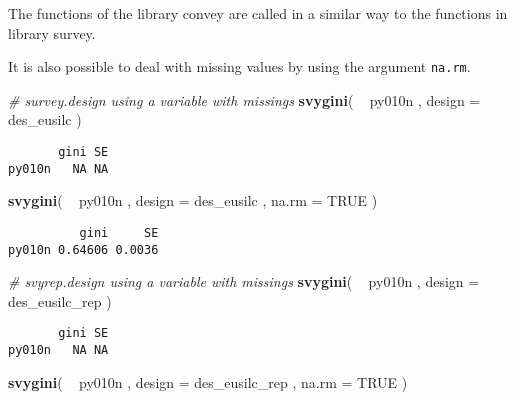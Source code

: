 \documentclass[]{book}
\newenvironment{Shaded}{\begin{snugshade}}{\end{snugshade}}
\newcommand{\KeywordTok}[1]{\textcolor[rgb]{0.13,0.29,0.53}{\textbf{{#1}}}}
\newcommand{\DataTypeTok}[1]{\textcolor[rgb]{0.13,0.29,0.53}{{#1}}}
\newcommand{\StringTok}[1]{\textcolor[rgb]{0.31,0.60,0.02}{{#1}}}
\newcommand{\CommentTok}[1]{\textcolor[rgb]{0.56,0.35,0.01}{\textit{{#1}}}}
\newcommand{\OtherTok}[1]{\textcolor[rgb]{0.56,0.35,0.01}{{#1}}}
\newcommand{\NormalTok}[1]{{#1}}
\begin{document}
The functions of the library convey are called in a similar way to the
functions in library survey.

It is also possible to deal with missing values by using the argument
\texttt{na.rm}.

\begin{Shaded}
\begin{Highlighting}[]
\CommentTok{# survey.design using a variable with missings}
\KeywordTok{svygini}\NormalTok{( ~}\StringTok{ }\NormalTok{py010n , }\DataTypeTok{design =} \NormalTok{des_eusilc )}
\end{Highlighting}
\end{Shaded}

\begin{verbatim}
       gini SE
py010n   NA NA
\end{verbatim}

\begin{Shaded}
\begin{Highlighting}[]
\KeywordTok{svygini}\NormalTok{( ~}\StringTok{ }\NormalTok{py010n , }\DataTypeTok{design =} \NormalTok{des_eusilc , }\DataTypeTok{na.rm =} \OtherTok{TRUE} \NormalTok{)}
\end{Highlighting}
\end{Shaded}

\begin{verbatim}
          gini     SE
py010n 0.64606 0.0036
\end{verbatim}

\begin{Shaded}
\begin{Highlighting}[]
\CommentTok{# svyrep.design using a variable with missings}
\KeywordTok{svygini}\NormalTok{( ~}\StringTok{ }\NormalTok{py010n , }\DataTypeTok{design =} \NormalTok{des_eusilc_rep )}
\end{Highlighting}
\end{Shaded}

\begin{verbatim}
       gini SE
py010n   NA NA
\end{verbatim}

\begin{Shaded}
\begin{Highlighting}[]
\KeywordTok{svygini}\NormalTok{( ~}\StringTok{ }\NormalTok{py010n , }\DataTypeTok{design =} \NormalTok{des_eusilc_rep , }\DataTypeTok{na.rm =} \OtherTok{TRUE} \NormalTok{)}
\end{Highlighting}
\end{Shaded}
\end{document}
